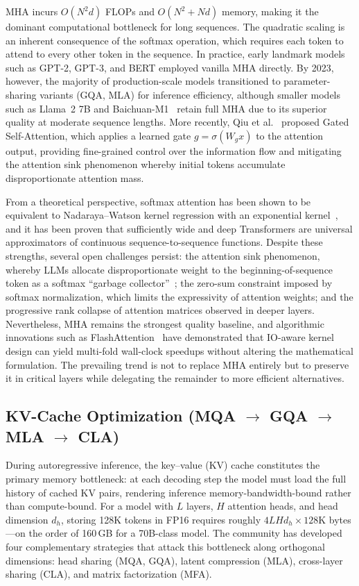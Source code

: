 MHA incurs $O(N^2 d)$ FLOPs and $O(N^2 + Nd)$ memory, making it the dominant computational bottleneck for long sequences. The quadratic scaling is an inherent consequence of the softmax operation, which requires each token to attend to every other token in the sequence. In practice, early landmark models such as GPT-2, GPT-3, and BERT employed vanilla MHA directly. By 2023, however, the majority of production-scale models transitioned to parameter-sharing variants (GQA, MLA) for inference efficiency, although smaller models such as Llama~2 7B and Baichuan-M1~\cite{baichuan2025m1} retain full MHA due to its superior quality at moderate sequence lengths. More recently, Qiu et al.~\cite{qiu2025gated} proposed Gated Self-Attention, which applies a learned gate $g = \sigma(W_g x)$ to the attention output, providing fine-grained control over the information flow and mitigating the attention sink phenomenon whereby initial tokens accumulate disproportionate attention mass.

From a theoretical perspective, softmax attention has been shown to be equivalent to Nadaraya--Watson kernel regression with an exponential kernel~\cite{tay2020efficient}, and it has been proven that sufficiently wide and deep Transformers are universal approximators of continuous sequence-to-sequence functions. Despite these strengths, several open challenges persist: the attention sink phenomenon, whereby LLMs allocate disproportionate weight to the beginning-of-sequence token as a softmax ``garbage collector''~\cite{xiao2023streamingllm}; the zero-sum constraint imposed by softmax normalization, which limits the expressivity of attention weights; and the progressive rank collapse of attention matrices observed in deeper layers. Nevertheless, MHA remains the strongest quality baseline, and algorithmic innovations such as FlashAttention~\cite{dao2022flashattention} have demonstrated that IO-aware kernel design can yield multi-fold wall-clock speedups without altering the mathematical formulation. The prevailing trend is not to replace MHA entirely but to preserve it in critical layers while delegating the remainder to more efficient alternatives.


\subsection{KV-Cache Optimization (MQA $\to$ GQA $\to$ MLA $\to$ CLA)}
\label{subsec:kv-cache-opt}

During autoregressive inference, the key--value (KV) cache constitutes the primary memory bottleneck: at each decoding step the model must load the full history of cached KV pairs, rendering inference memory-bandwidth-bound rather than compute-bound. For a model with $L$ layers, $H$ attention heads, and head dimension $d_h$, storing 128K tokens in FP16 requires roughly $4LHd_h \times 128\text{K}$ bytes---on the order of 160\,GB for a 70B-class model. The community has developed four complementary strategies that attack this bottleneck along orthogonal dimensions: head sharing (MQA, GQA), latent compression (MLA), cross-layer sharing (CLA), and matrix factorization (MFA).

